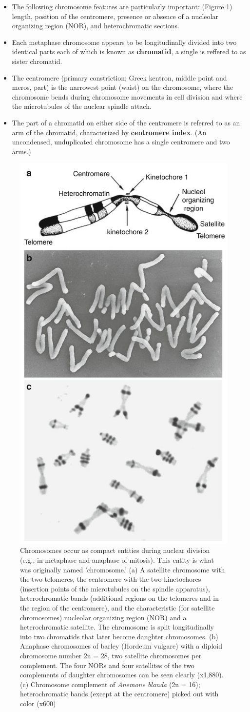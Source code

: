 \documentclass[11pt,dvipsnames,ignorenonframetext,aspectratio=169]{beamer}
\providecommand{\tightlist}{%
  \setlength{\itemsep}{0pt}\setlength{\parskip}{0pt}}
\begin{document}
\begin{frame}{}
\protect\hypertarget{section-2}{}
\begin{itemize}
\tightlist
\item
  The following chromosome features are particularly important: (Figure
  \ref{fig:chromosome-structure}) length, position of the centromere,
  presence or absence of a nucleolar organizing region (NOR), and
  heterochromatic sections.
\item
  Each metaphase chromosome appears to be longitudinally divided into
  two identical parts each of which is known as \textbf{chromatid}, a
  single is reffered to as sister chromatid.
\item
  The centromere (primary constriction; Greek kentron, middle point and
  meros, part) is the narrowest point (waist) on the chromosome, where
  the chromosome bends during chromosome movements in cell division and
  where the microtubules of the nuclear spindle attach.
\item
  The part of a chromatid on either side of the centromere is referred
  to as an arm of the chromatid, characterized by \textbf{centromere
  index}. (An uncondensed, unduplicated chromosome has a single
  centromere and two arms.)
\end{itemize}
\end{frame}

\begin{frame}{}
\protect\hypertarget{section-3}{}
\begin{figure}
\includegraphics[width=0.22\linewidth]{../images/chromosome_structure} \caption{Chromosomes occur as compact entities during nuclear division (e.g., in metaphase and anaphase of mitosis). This entity is what was originally named 'chromosome.' (a) A satellite chromosome with the two telomeres, the centromere with the two kinetochores (insertion points of the microtubules on the spindle apparatus), heterochromatic bands (additional regions on the telomeres and in the region of the centromere), and the characteristic (for satellite chromosomes) nucleolar organizing region (NOR) and a heterochromatic satellite. The chromosome is split longitudinally into two chromatids that later become daughter chromosomes. (b) Anaphase chromosomes of barley (Hordeum vulgare) with a diploid chromosome number 2n = 28, two satellite chromosomes per complement. The four NORs and four satellites of the two complements of daughter chromosomes can be seen clearly (x1,880). (c) Chromosome complement of \textit{Anemone blanda} (2n = 16); heterochromatic bands (except at the centromere) picked out with color (x600)}\label{fig:chromosome-structure}
\end{figure}
\end{frame}
\end{document}

